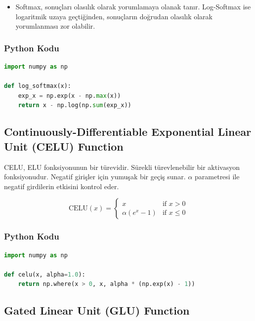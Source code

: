 \begin{itemize}
    \item Softmax, sonuçları olasılık olarak yorumlamaya olanak tanır. Log-Softmax ise logaritmik uzaya geçtiğinden, sonuçların doğrudan olasılık olarak yorumlanması zor olabilir.
\end{itemize}

\subsubsection{Python Kodu}

\begin{lstlisting}[language=Python]
import numpy as np

def log_softmax(x):
    exp_x = np.exp(x - np.max(x))
    return x - np.log(np.sum(exp_x))
\end{lstlisting}

\newpage

\subsection{Continuously-Differentiable Exponential Linear Unit (CELU) Function}

CELU, ELU fonksiyonunun bir türevidir. Sürekli türevlenebilir bir aktivasyon fonksiyonudur. Negatif girişler için yumuşak bir geçiş sunar. $\alpha$ parametresi ile negatif girdilerin etkisini kontrol eder.

\[
\text{CELU}(x) = 
\begin{cases} 
x & \text{if } x > 0 \\ 
\alpha(e^{x} - 1) & \text{if } x \leq 0 
\end{cases}
\]

\subsubsection{Python Kodu}

\begin{lstlisting}[language=Python]
import numpy as np

def celu(x, alpha=1.0):
    return np.where(x > 0, x, alpha * (np.exp(x) - 1))
\end{lstlisting}

\newpage

\subsection{Gated Linear Unit (GLU) Function}

